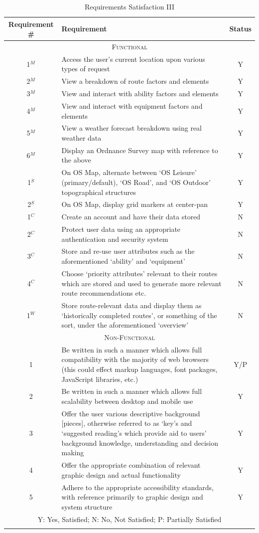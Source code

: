 \documentclass[11pt, english]{article}
\begin{document}
	\begin{center}
		\scriptsize
	\begin{longtable}{cp{10cm}c}
		Requirement \# & Requirement & Status\\
		\hline
		\multicolumn{3}{c}{\textsc{Functional}}\\
		\hline
		1$^M$ & Access the user's current location upon various types of request & Y\\
		2$^M$ & View a breakdown of route factors and elements & Y\\
		3$^M$ & View and interact with ability factors and elements & Y\\
		4$^M$ & View and interact with equipment factors and elements & Y\\
		5$^M$ & View a weather forecast breakdown using real weather data & Y\\
		6$^M$ & Display an Ordnance Survey map with reference to the above & Y\\
		1$^S$ & On OS Map, alternate between `OS Leisure' (primary/default), `OS Road', and `OS Outdoor' topographical structures & Y\\
		2$^S$ & On OS Map, display grid markers at center-pan & Y\\
		1$^C$ & Create an account and have their data stored & N\\
		2$^C$ & Protect user data using an appropriate authentication and security system & N\\
		3$^C$ & Store and re-use user attributes such as the aforementioned `ability' and `equipment' & N\\
		4$^C$ & Choose `priority attributes' relevant to their routes which are stored and used to generate more relevant route recommendations etc. & N\\
		1$^W$ & Store route-relevant data and display them as `historically completed routes', or something of the sort, under the aforementioned `overview' & N\\
		\hline
		\multicolumn{3}{c}{\textsc{Non-Functional}}\\
		\hline
		1 & Be written in such a manner which allows full compatibility with the majority of web browsers (this could effect markup languages, font packages, JavaScript libraries, etc.) & Y/P\\
		2 & Be written in such a manner which allows full scalability between desktop and mobile use & Y\\
		3 & Offer the user various descriptive background [pieces], otherwise referred to as `key's and `suggested reading's which provide aid to users' background knowledge, understanding and decision making & Y\\
		4 & Offer the appropriate combination of relevant graphic design and actual functionality & Y\\
		5 & Adhere to the appropriate accessibility standards, with reference primarily to graphic design and system structure & Y\\
		\hline
		\multicolumn{3}{p{12cm}}{Y: Yes, Satisfied; N: No, Not Satisfied; P: Partially Satisfied}\\
		\hline
		\caption{Requirements Satisfaction III}
	\end{longtable}
	\end{center}
\end{document}
